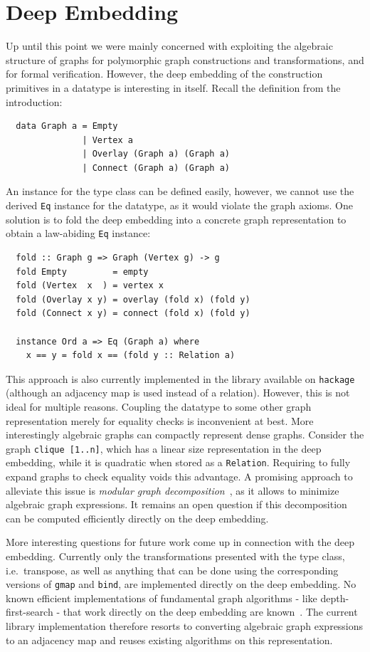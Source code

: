 \documentclass{article}
\newcommand{\hs}{\texttt}
\begin{document}
\section{Deep Embedding}\label{sec:deep}
Up until this point we were mainly concerned with exploiting the algebraic
structure of graphs for polymorphic graph constructions and transformations, and
for formal verification. However, the deep embedding of the
construction primitives in a datatype is interesting in itself. Recall the
definition from the introduction:
\begin{verbatim}
  data Graph a = Empty
               | Vertex a
               | Overlay (Graph a) (Graph a)
               | Connect (Graph a) (Graph a)
\end{verbatim}
An instance for the type class can be defined easily, however, we cannot use the
derived \hs{Eq} instance for the datatype, as it would violate the graph axioms.
One solution is to fold the deep embedding into a concrete graph representation to
obtain a law-abiding \hs{Eq} instance:
\begin{verbatim}
  fold :: Graph g => Graph (Vertex g) -> g
  fold Empty         = empty
  fold (Vertex  x  ) = vertex x
  fold (Overlay x y) = overlay (fold x) (fold y)
  fold (Connect x y) = connect (fold x) (fold y)

  instance Ord a => Eq (Graph a) where
    x == y = fold x == (fold y :: Relation a)
\end{verbatim}
This approach is also currently implemented in the library available on
\texttt{hackage} (although an adjacency map is used instead of a relation).
However, this is not ideal for multiple reasons. Coupling the datatype to some
other graph representation merely for equality checks is inconvenient at best.
More interestingly algebraic graphs can compactly represent dense graphs.
Consider the graph \hs{clique [1..n]}, which has a linear size representation in
the deep embedding, while it is quadratic when stored as a \hs{Relation}.
Requiring to fully expand graphs to check equality voids this advantage. A
promising approach to alleviate this issue is \textit{modular graph
  decomposition}~\cite{mcconnell2005linear}, as it allows to minimize algebraic
graph expressions. It remains an open question if this decomposition can be
computed efficiently directly on the deep embedding.

More interesting questions for future work come up in connection with the deep
embedding. Currently only the transformations presented with the type class, i.e.\
transpose, as well as anything that can be done using the corresponding versions
of \hs{gmap} and \hs{bind}, are implemented directly on the deep embedding. No
known efficient implementations of fundamental graph algorithms - like
depth-first-search - that work directly on the deep embedding are
known~\cite{mokhov2017algebraic}. The current library implementation therefore
resorts to converting algebraic graph expressions to an adjacency map and reuses
existing algorithms on this representation.
\end{document}
